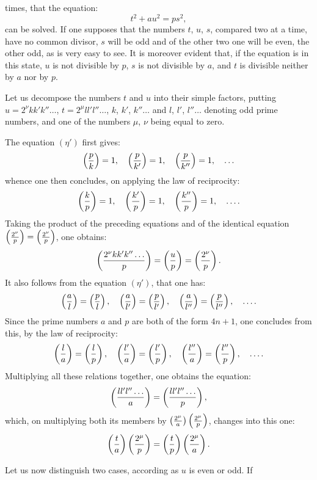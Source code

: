 \noindent
times, that the equation:
\begin{equation*}\tag{$\eta'$}
t^2+au^2=ps^2,
\end{equation*}
can be solved. If one supposes that the numbers $t$, $u$, $s$, compared two at a
time, have no common divisor, $s$ will be odd and of the other two one will be
even, the other odd, as is very easy to see. It is moreover evident
that, if the equation is in this state, $u$ is not divisible by $p$, $s$ is not divisible
by $a$, and $t$ is divisible neither by $a$ nor by $p$.
\par\indent
Let us decompose the numbers $t$ and $u$ into their simple factors, putting
$u=2^\nu kk'k''\ldots$, $t=2^\mu ll'l''\ldots$, $k$, $k'$, $k''\ldots$ and $l$, $l'$, $l''\ldots$ denoting odd
prime numbers, and one of the numbers $\mu$, $\nu$ being equal to zero.
\par\indent
The equation $(\eta')$ first gives:
\[
\left(\frac{p}{k}\right)=1,\quad\left(\frac{p}{k'}\right)=1,\quad\left(\frac{p}{k''}\right)=1,\quad\ldots
\]
whence one then concludes, on applying the law of reciprocity:
\[
\left(\frac{k}{p}\right)=1,\quad\left(\frac{k'}{p}\right)=1,\quad\left(\frac{k''}{p}\right)=1,\quad\ldots.
\]
Taking the product of the preceding equations and of the identical equation $\left(\frac{2^\nu}{p}\right)=\left(\frac{2^\nu}{p}\right)$,
one obtains:
\[
\left(\frac{2^\nu kk'k''\ldots}{p}\right)=\left(\frac{u}{p}\right)=\left(\frac{2^\nu}{p}\right).
\]
It also follows from the equation $(\eta')$, that one has:
\[
\left(\frac{a}{l}\right)=\left(\frac{p}{l}\right),\quad\left(\frac{a}{l'}\right)=\left(\frac{p}{l'}\right),\quad
\left(\frac{a}{l''}\right)=\left(\frac{p}{l''}\right),\quad\ldots.
\]
Since the prime numbers $a$ and $p$ are both of the form $4n+1$,
one concludes from this, by the law of reciprocity:
\[
\left(\frac{l}{a}\right)=\left(\frac{l}{p}\right),\quad\left(\frac{l'}{a}\right)=\left(\frac{l'}{p}\right),\quad
\left(\frac{l''}{a}\right)=\left(\frac{l''}{p}\right),\quad\ldots.
\]
Multiplying all these relations together, one obtains the equation:
\[
\left(\frac{ll'l''\ldots}{a}\right)=\left(\frac{ll'l''\ldots}{p}\right),
\]
which, on multiplying both its members by $\left(\frac{2^\mu}{a}\right)\left(\frac{2^\mu}{p}\right)$, changes into this one:
\[
\left(\frac{t}{a}\right)\left(\frac{2^\mu}{p}\right)=\left(\frac{t}{p}\right)\left(\frac{2^\mu}{a}\right).
\]
\par\indent
Let us now distinguish two cases, according as $u$ is even or odd. If
